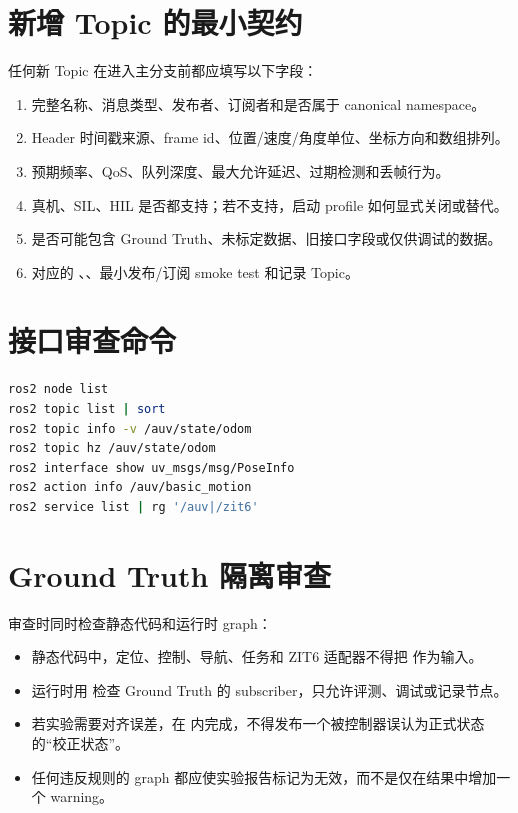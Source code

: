 \section{新增 Topic 的最小契约}
任何新 Topic 在进入主分支前都应填写以下字段：

\begin{enumerate}
  \item 完整名称、消息类型、发布者、订阅者和是否属于 canonical namespace。
  \item Header 时间戳来源、frame id、位置/速度/角度单位、坐标方向和数组排列。
  \item 预期频率、QoS、队列深度、最大允许延迟、过期检测和丢帧行为。
  \item 真机、SIL、HIL 是否都支持；若不支持，启动 profile 如何显式关闭或替代。
  \item 是否可能包含 Ground Truth、未标定数据、旧接口字段或仅供调试的数据。
  \item 对应的 、、最小发布/订阅 smoke test 和记录 Topic。
\end{enumerate}

\section{接口审查命令}
\begin{lstlisting}[language=bash,caption={运行时契约的最小检查命令}]
ros2 node list
ros2 topic list | sort
ros2 topic info -v /auv/state/odom
ros2 topic hz /auv/state/odom
ros2 interface show uv_msgs/msg/PoseInfo
ros2 action info /auv/basic_motion
ros2 service list | rg '/auv|/zit6'
\end{lstlisting}

\section{Ground Truth 隔离审查}
审查时同时检查静态代码和运行时 graph：

\begin{itemize}
  \item 静态代码中，定位、控制、导航、任务和 ZIT6 适配器不得把  作为输入。
  \item 运行时用  检查 Ground Truth 的 subscriber，只允许评测、调试或记录节点。
  \item 若实验需要对齐误差，在  内完成，不得发布一个被控制器误认为正式状态的“校正状态”。
  \item 任何违反规则的 graph 都应使实验报告标记为无效，而不是仅在结果中增加一个 warning。
\end{itemize}

